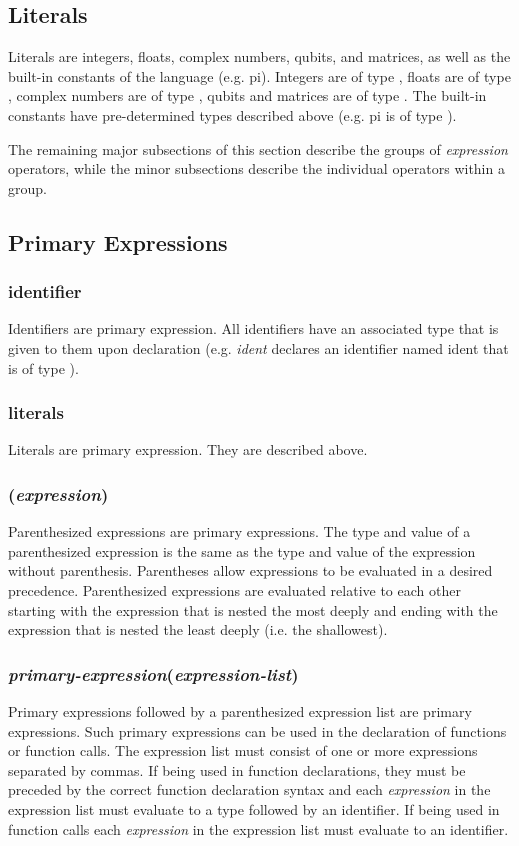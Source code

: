 
\subsection{Literals}
Literals are integers, floats, complex numbers, qubits, and matrices, as well as the built-in constants of the language (e.g. \textsf{pi}). Integers are of type \integ, floats are of type \float, complex numbers are of type \complex, qubits and matrices are of type \mat. The built-in constants have pre-determined types described above (e.g. \textsf{pi} is of type \float).

The remaining major subsections of this section describe the groups of \textit{expression} operators, while the minor subsections describe the individual operators within a group.
\subsection{Primary Expressions}
\subsubsection{identifier}
Identifiers are primary expression. All identifiers have an associated type that is given to them upon declaration (e.g. \float \textit{ident} declares an identifier named ident that is of type \float).
\subsubsection{literals}
Literals are primary expression. They are described above.

\subsubsection{(\textit{expression})}
Parenthesized expressions are primary expressions. The type and value of a parenthesized expression is the same as the type and value of the expression without parenthesis. Parentheses allow expressions to be evaluated in a desired precedence. Parenthesized expressions are evaluated relative to each other starting with the expression that is nested the most deeply and ending with the expression that is nested the least deeply (i.e. the shallowest).

\subsubsection{\textit{primary-expression}(\textit{expression-list})}
Primary expressions followed by a parenthesized expression list are primary expressions. Such primary expressions can be used in the declaration of functions or function calls. The expression list must consist of one or more expressions separated by commas. If being used in function declarations, they must be preceded by the correct function declaration syntax and each \textit{expression} in the expression list must evaluate to a type followed by an identifier. If being used in function calls each \textit{expression} in the expression list must evaluate to an identifier.

